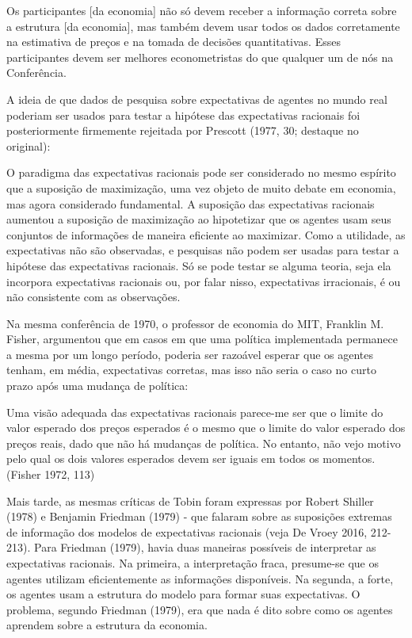 \documentclass[12pt]{article}
\begin{document}
Os participantes [da economia] não só devem receber a informação correta sobre a estrutura [da economia], mas também devem usar todos os dados corretamente na estimativa de preços e na tomada de decisões quantitativas. Esses participantes devem ser melhores econometristas do que qualquer um de nós na Conferência.

A ideia de que dados de pesquisa sobre expectativas de agentes no mundo real poderiam ser usados para testar a hipótese das expectativas racionais foi posteriormente firmemente rejeitada por Prescott (1977, 30; destaque no original):

O paradigma das expectativas racionais pode ser considerado no mesmo espírito que a suposição de maximização, uma vez objeto de muito debate em economia, mas agora considerado fundamental. A suposição das expectativas racionais aumentou a suposição de maximização ao hipotetizar que os agentes usam seus conjuntos de informações de maneira eficiente ao maximizar. Como a utilidade, as expectativas não são observadas, e pesquisas não podem ser usadas para testar a hipótese das expectativas racionais. Só se pode testar se alguma teoria, seja ela incorpora expectativas racionais ou, por falar nisso, expectativas irracionais, é ou não consistente com as observações.

Na mesma conferência de 1970, o professor de economia do MIT, Franklin M. Fisher, argumentou que em casos em que uma política implementada permanece a mesma por um longo período, poderia ser razoável esperar que os agentes tenham, em média, expectativas corretas, mas isso não seria o caso no curto prazo após uma mudança de política:

Uma visão adequada das expectativas racionais parece-me ser que o limite do valor esperado dos preços esperados é o mesmo que o limite do valor esperado dos preços reais, dado que não há mudanças de política. No entanto, não vejo motivo pelo qual os dois valores esperados devem ser iguais em todos os momentos. (Fisher 1972, 113)

Mais tarde, as mesmas críticas de Tobin foram expressas por Robert Shiller (1978) e Benjamin Friedman (1979) - que falaram sobre as suposições extremas de informação dos modelos de expectativas racionais (veja De Vroey 2016, 212-213). Para Friedman (1979), havia duas maneiras possíveis de interpretar as expectativas racionais. Na primeira, a interpretação fraca, presume-se que os agentes utilizam eficientemente as informações disponíveis. Na segunda, a forte, os agentes usam a estrutura do modelo para formar suas expectativas. O problema, segundo Friedman (1979), era que nada é dito sobre como os agentes aprendem sobre a estrutura da economia.
\end{document}
